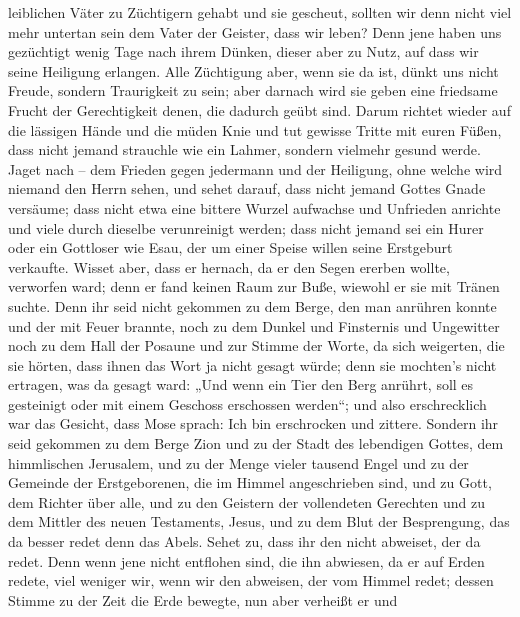 leiblichen Väter zu Züchtigern gehabt und sie gescheut, sollten wir denn
nicht viel mehr untertan sein dem Vater der Geister, dass wir leben?
 Denn jene haben uns gezüchtigt wenig Tage nach ihrem
Dünken, dieser aber zu Nutz, auf dass wir seine Heiligung erlangen.
 Alle Züchtigung aber, wenn sie da ist, dünkt uns nicht
Freude, sondern Traurigkeit zu sein; aber darnach wird sie geben eine
friedsame Frucht der Gerechtigkeit denen, die dadurch geübt sind.
 Darum richtet wieder auf die lässigen Hände und die müden
Knie  und tut gewisse Tritte mit euren Füßen, dass nicht
jemand strauchle wie ein Lahmer, sondern vielmehr gesund werde.
 Jaget nach -- dem Frieden gegen jedermann und der
Heiligung, ohne welche wird niemand den Herrn sehen,  und
sehet darauf, dass nicht jemand Gottes Gnade versäume; dass nicht etwa
eine bittere Wurzel aufwachse und Unfrieden anrichte und viele durch
dieselbe verunreinigt werden;  dass nicht jemand sei ein
Hurer oder ein Gottloser wie Esau, der um einer Speise willen seine
Erstgeburt verkaufte.  Wisset aber, dass er hernach, da er
den Segen ererben wollte, verworfen ward; denn er fand keinen Raum zur
Buße, wiewohl er sie mit Tränen suchte.  Denn ihr seid
nicht gekommen zu dem Berge, den man anrühren konnte und der mit Feuer
brannte, noch zu dem Dunkel und Finsternis und Ungewitter 
noch zu dem Hall der Posaune und zur Stimme der Worte, da sich
weigerten, die sie hörten, dass ihnen das Wort ja nicht gesagt würde;
 denn sie mochten's nicht ertragen, was da gesagt ward:
„Und wenn ein Tier den Berg anrührt, soll es gesteinigt oder mit einem
Geschoss erschossen werden``;  und also erschrecklich war
das Gesicht, dass Mose sprach: Ich bin erschrocken und zittere.
 Sondern ihr seid gekommen zu dem Berge Zion und zu der
Stadt des lebendigen Gottes, dem himmlischen Jerusalem, und zu der Menge
vieler tausend Engel  und zu der Gemeinde der
Erstgeborenen, die im Himmel angeschrieben sind, und zu Gott, dem
Richter über alle, und zu den Geistern der vollendeten Gerechten
 und zu dem Mittler des neuen Testaments, Jesus, und zu dem
Blut der Besprengung, das da besser redet denn das Abels. 
Sehet zu, dass ihr den nicht abweiset, der da redet. Denn wenn jene
nicht entflohen sind, die ihn abwiesen, da er auf Erden redete, viel
weniger wir, wenn wir den abweisen, der vom Himmel redet; 
dessen Stimme zu der Zeit die Erde bewegte, nun aber verheißt er und
